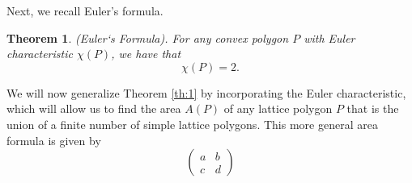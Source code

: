 \documentclass{article}
\newtheorem{theorem}{Theorem}[section]
\begin{document}
	Next, we recall Euler’s formula.
	
	\begin{theorem}
		(Euler`s Formula). For any convex polygon $P$ with Euler characteristic $\chi(P)$,
		we have that
		\begin{equation}
			\label{eq:2}
			\chi(P)=2.
		\end{equation}
	\end{theorem}


We will now generalize Theorem \ref{th:1} by incorporating the Euler characteristic, which will
allow us to find the area $A(P)$ of any lattice polygon $P$ that is the union of a finite number
of simple lattice polygons. This more general area formula is given by
\[
\begin{pmatrix}
	a & b \\
	c & d
\end{pmatrix}
\]
\end{document}
